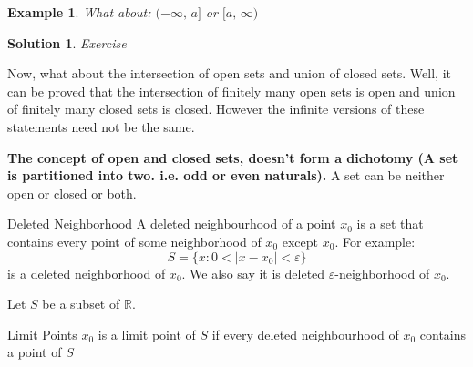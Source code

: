 \documentclass{article}
\newcommand{\R}{\mathbb{R}}
\newcommand{\e}{\varepsilon}
\newtheorem{example}{Example}
\newtheorem{solution}{Solution}
\begin{document}
\begin{example}{
 What about: $\displaystyle{(-\infty,\,a]}$ or $\displaystyle{[a,\,\infty)}$
}\end{example}\begin{solution}{
  Exercise
}\end{solution}\vspace{10pt}

Now, what about the intersection of open sets and union of closed sets. Well, it can be proved that the intersection of finitely many open sets is open and union of finitely many closed sets is closed. However the infinite versions of these statements need not be the same.

{\color{red} \textbf{The concept of open and closed sets, doesn't form a dichotomy (A set is partitioned into two. i.e. odd or even naturals). }} A set can be neither open or closed or both.\\

\begin{definition}{Deleted Neighborhood}
 A {\color{blue} deleted neighbourhood } of a point $\displaystyle{x_0}$ is a set that contains every point of some neighborhood of $\displaystyle{x_0}$ except $\displaystyle{x_0}$. For example:
 $$ S = \{x : 0 < |x - x_0| < \e \} $$
 is a deleted neighborhood of $x_0$. We also say it is deleted $\e$-neighborhood of $x_0$.
\end{definition}\vspace{10pt}

Let $S$ be a subset of $\R$.

\begin{definition}{Limit Points}{}
  $x_0$ is a {\color{blue} limit point } of $S$ if every deleted neighbourhood of $x_0$ contains a point of $S$
\end{definition}\vspace{10pt}
\end{document}
